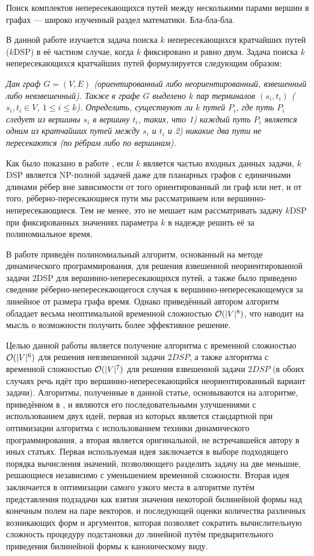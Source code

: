 \Introduction

Поиск комплектов непересекающихся путей между несколькими парами вершин в графах --- широко изученный раздел математики. Бла-бла-бла.

В данной работе изучается задача поиска $k$ непересекающихся кратчайших путей ($k$DSP) в её частном случае, когда $k$ фиксировано и равно двум. Задача поиска $k$ непересекающихся кратчайших путей формулируется следующим образом:

\emph{Дан граф $G = (V, E)$ (ориентированный либо неориентированный, взвешенный либо невзвешенный). Также в графе $G$ выделено $k$ пар терминалов $(s_i, t_i)$ ($s_i, t_i \in V$, $1 \leq i \leq k$). Определить, существуют ли $k$ путей $P_i$, где путь $P_i$ следует из вершины $s_i$ в вершину $t_i$, таких, что 1) каждый путь $P_i$ является одним из кратчайших путей между $s_i$ и $t_i$ и 2) никакие два пути не пересекаются (по рёбрам либо по вершинам).}

Как было показано в работе \cite{ET}, если $k$ является частью входных данных задачи, $k$DSP является NP-полной задачей даже для планарных графов с единичными длинами рёбер вне зависимости от того ориентированный ли граф или нет, и от того, рёберно-пересекающиеся пути мы рассматриваем или вершинно-непересекающиеся. Тем не менее, это не мешает нам рассматривать задачу $k$DSP при фиксированных значениях параметра $k$ в надежде решить её за полиномиальное время. 

В работе \cite{ET} приведён полиномиальный алгоритм, основанный на методе динамического программирования, для решения взвешенной неориентированной задачи $2$DSP для вершинно-непересекающихся путей, а также было приведено сведение рёберно-непересекающегося случая к вершинно-непересекающемуся за линейное от размера графа время. Однако приведённый автором алгоритм обладает весьма неоптимальной временной сложностью $\mathcal{O}(|V|^8)$, что наводит на мысль о возможности получить более эффективное решение.

Целью данной работы является получение алгоритма с временной сложностью $\mathcal{O}(|V|^6)$ для решения невзвешенной задачи $2DSP$, а также алгоритма с временной сложностью $\mathcal{O}(|V|^7)$ для решения взвешенной задачи $2DSP$ (в обоих случаях речь идёт про вершинно-непересекающийся неориентированный вариант задачи). Алгоритмы, полученные в данной статье, основываются на алгоритме, приведённом в \cite{ET}, и являются его последовательными улучшениями с использованием двух идей, первая из которых является стандартной при оптимизации алгоритма с использованием техники динамического программирования, а вторая является оригинальной, не встречавшейся автору в иных статьях. Первая используемая идея заключается в выборе подходящего порядка вычисления значений, позволяющего разделить задачу на две меньшие, решающиеся независимо с уменьшением временной сложности. Вторая идея заключается в оптимизации самого узкого места в алгоритме путём представления подзадачи как взятия значения некоторой билинейной формы над конечным полем на паре векторов, и последующей оценки количества различных возникающих форм и аргументов, которая позволяет сократить вычислительную сложность процедуру подстановки до линейной путём предварительного приведения билинейной формы к каноническому виду.

